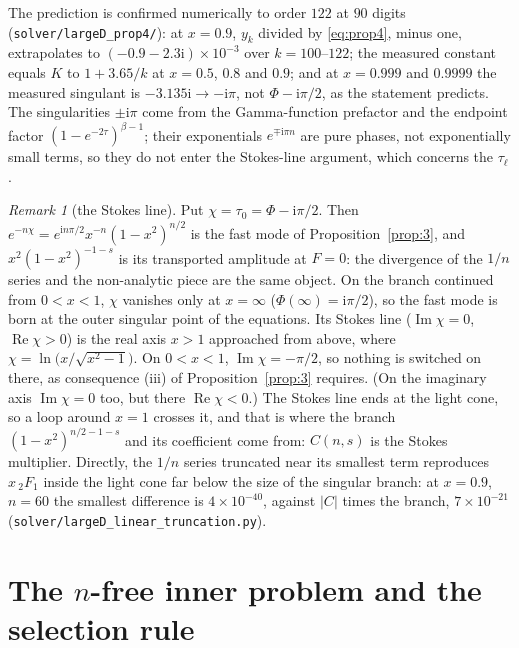 \documentclass{amsart}
\numberwithin{equation}{section}
\theoremstyle{plain}
\theoremstyle{definition}
\theoremstyle{remark}
\newtheorem{remark}[definition]{Remark}
\newcommand{\re}{\operatorname{Re}}
\newcommand{\im}{\operatorname{Im}}
\newcommand{\iu}{\mathrm{i}}
\newcommand{\repo}[1]{\texttt{#1}}
\begin{document}
The prediction is confirmed numerically to order $122$ at $90$ digits (\repo{solver/largeD\_prop4/}): at $x = 0.9$,
$y_k$ divided by \eqref{eq:prop4}, minus one, extrapolates to $(-0.9 - 2.3\iu)\times10^{-3}$ over $k = 100$--$122$; the
measured constant equals $K$ to $1 + 3.65/k$ at $x = 0.5$, $0.8$ and $0.9$; and at $x = 0.999$ and $0.9999$ the measured
singulant is $-3.135\iu \to -\iu\pi$, not $\Phi - \iu\pi/2$, as the statement predicts. The singularities $\pm\iu\pi$ come
from the Gamma-function prefactor and the endpoint factor $(1-e^{-2\tau})^{\beta-1}$; their exponentials $e^{\mp\iu\pi n}$
are pure phases, not exponentially small terms, so they do not enter the Stokes-line argument, which concerns the
$\tau_\ell$.

\begin{remark}[the Stokes line]\label{rem:stokesline}
Put $\chi = \tau_0 = \Phi - \iu\pi/2$. Then $e^{-n\chi} = e^{\iu n\pi/2}x^{-n}(1-x^2)^{n/2}$ is the fast mode of
Proposition~\ref{prop:3}, and $x^2(1-x^2)^{-1-s}$ is its transported amplitude at $F = 0$: the divergence of the $1/n$
series and the non-analytic piece are the same object. On the branch continued from $0 < x < 1$, $\chi$ vanishes only at
$x = \infty$ ($\Phi(\infty) = \iu\pi/2$), so the fast mode is born at the outer singular point of the equations. Its
Stokes line ($\im\chi = 0$, $\re\chi > 0$) is the real axis $x > 1$ approached from above, where
$\chi = \ln\big(x/\sqrt{x^2-1}\big)$. On $0 < x < 1$, $\im\chi = -\pi/2$, so nothing is switched on there, as
consequence (iii) of Proposition~\ref{prop:3} requires. (On the imaginary axis $\im\chi = 0$ too, but there
$\re\chi < 0$.) The Stokes line ends at the light cone, so a loop around $x = 1$ crosses it, and that is where the
branch $(1-x^2)^{n/2-1-s}$ and its coefficient come from: $C(n,s)$ is the Stokes multiplier. Directly, the $1/n$ series
truncated near its smallest term reproduces $x\,{}_2F_1$ inside the light cone far below the size of the singular branch:
at $x = 0.9$, $n = 60$ the smallest difference is $4\times10^{-40}$, against $|C|$ times the branch, $7\times10^{-21}$
(\repo{solver/largeD\_linear\_truncation.py}).
\end{remark}

\section{The \texorpdfstring{$n$}{n}-free inner problem and the selection rule}
\label{sec:inner}
\end{document}
